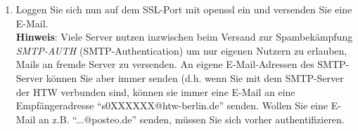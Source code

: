\documentclass[paper=a4,fontsize=11pt]{scrartcl}%
\numberwithin{equation}{section}
\begin{document}
\begin{enumerate}
 	\item Loggen Sie sich nun auf dem SSL-Port mit openssl ein und versenden Sie eine E-Mail.\\
 	\textbf{Hinweis}: Viele Server nutzen inzwischen beim Versand zur Spambekämpfung \emph{SMTP-AUTH} (SMTP-Authentication) um nur eigenen Nutzern zu erlauben, Mails an fremde Server zu versenden. An eigene E-Mail-Adressen des SMTP-Server können Sie aber immer senden (d.h. wenn Sie mit dem SMTP-Server der HTW verbunden sind, können sie immer eine E-Mail an eine Empfängeradresse \enquote{s0XXXXXX@htw-berlin.de} senden. Wollen Sie eine E-Mail an z.B. \enquote{...@posteo.de} senden, müssen Sie sich vorher authentifizieren.
\end{enumerate}
\end{document}
